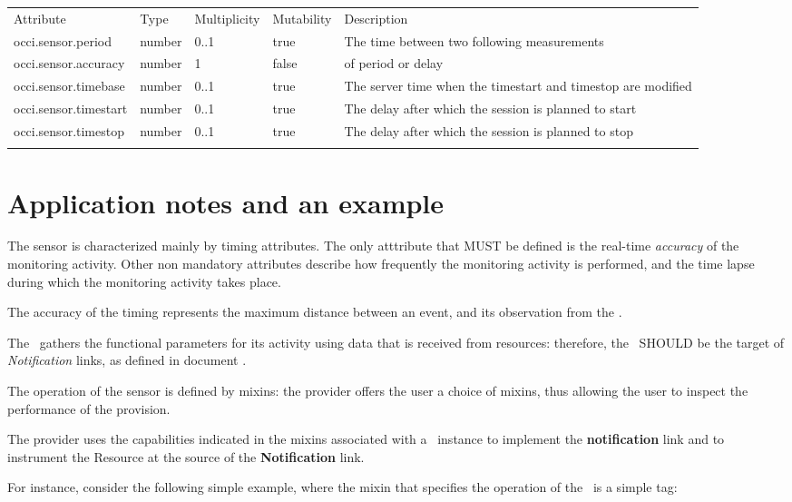 \documentclass[10pt,a4paper]{article}
\begin{document}
{
	\begin{tabular}{lp{2.5cm}p{1cm}lp{6cm}}
	\toprule
	Attribute&Type&Multi\-plicity&Mutability&Description\\
	\colrule
occi.sensor.period & number & 0..1 & true & The time between two following measurements \\
occi.sensor.accuracy & number & 1 & false & of period or delay \\
occi.sensor.timebase & number & 0..1 & true & The server time when the timestart and timestop are modified \\  
occi.sensor.timestart &	number & 0..1 & true & The delay after which the session is planned to start \\
occi.sensor.timestop & number	& 0..1 & true & The delay after which the session is planned to stop \\
	\botrule
	\end{tabular}
}

\section{Application notes and an example}

The sensor is characterized mainly by timing attributes. The only atttribute that MUST be defined is the real-time {\em accuracy} of the monitoring activity. Other non mandatory attributes describe how frequently the monitoring activity is performed, and the time lapse during which the monitoring activity takes place.

The accuracy of the timing represents the maximum distance between an event, and its observation from the \sens.

The \sens\ gathers the functional parameters for its activity using data that is received from resources: therefore, the \sens\ SHOULD be the target of {\em Notification} links, as defined in document \cite{occi:notification}.

The operation of the sensor is defined by mixins: the provider offers the user a choice of mixins, thus allowing the user to inspect the performance of the provision.

The provider uses the capabilities indicated in the mixins associated with a \sens\ instance to implement the {\bf notification} link and to instrument the Resource at the source of the {\bf Notification} link.

For instance, consider the following simple example, where the mixin that specifies the operation of the \sens\ is a simple tag:
\end{document}
